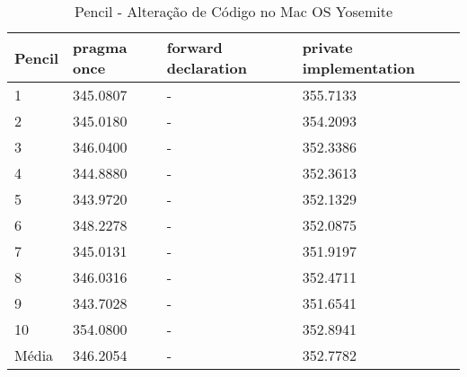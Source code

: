 \begin{table}[!h]
\centering
\caption{Pencil - Alteração de Código no Mac OS Yosemite}
\label{tab:alteracao_de_codigo:mac:pencil}
\begin{tabular}{llll}
\textbf{Pencil} & \textbf{pragma once} & \textbf{forward declaration} & \textbf{private implementation}   \\ \toprule
1                                    & 345.0807  &  -   & 355.7133  \\ 
2                                    & 345.0180  &  -   & 354.2093  \\ 
3                                    & 346.0400  &  -   & 352.3386  \\ 
4                                    & 344.8880  &  -   & 352.3613  \\ 
5                                    & 343.9720  &  -   & 352.1329  \\ 
6                                    & 348.2278  &  -   & 352.0875  \\ 
7                                    & 345.0131  &  -   & 351.9197  \\ 
8                                    & 346.0316  &  -   & 352.4711  \\ 
9                                    & 343.7028  &  -   & 351.6541  \\ 
10                                   & 354.0800  &  -   & 352.8941  \\ \bottomrule 
Média                                & 346.2054  &  -   & 352.7782  \\
\end{tabular}
\end{table}

